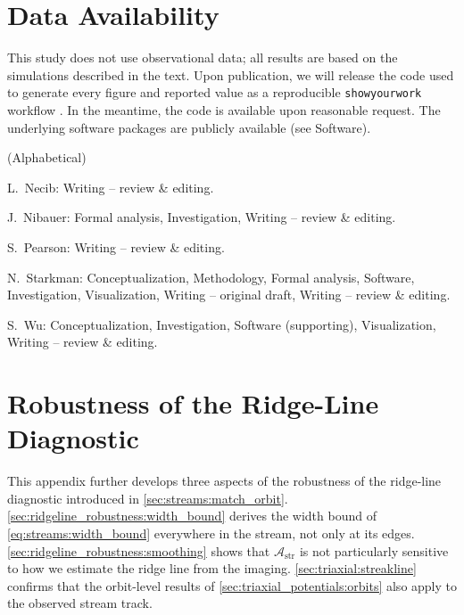 \documentclass[linenumbers,twocolumn]{aastex701}
\newcommand{\Astr}{\mathcal{A}_{\mathrm{str}}}
\begin{document}
\section*{Data Availability}\label{sec:data_availability}
    This study does not use observational data; all results are based on the simulations described in the text. %
    Upon publication, we will release the code used to generate every figure and reported value as a reproducible \texttt{showyourwork} workflow \citep{Luger+:2021:showyourwork}. %
    In the meantime, the code is available upon reasonable request. %
    The underlying software packages are publicly available (see Software). %

\begin{contribution}\label{sec:author_contributions}
    (Alphabetical)

    L.~Necib: Writing -- review \& editing.

    J.~Nibauer: Formal analysis, Investigation, Writing -- review \& editing.

    S.~Pearson: Writing -- review \& editing.

    N.~Starkman: Conceptualization, Methodology, Formal analysis, Software, Investigation, Visualization, Writing -- original draft, Writing -- review \& editing.

    S.~Wu: Conceptualization, Investigation, Software (supporting), Visualization, Writing -- review \& editing.
\end{contribution}



\appendix


\section{Robustness of the Ridge-Line Diagnostic}\label{sec:ridgeline_robustness}

    This appendix further develops three aspects of the robustness of the ridge-line diagnostic introduced in \autoref{sec:streams:match_orbit}. %
    \autoref{sec:ridgeline_robustness:width_bound} derives the width bound of \cref{eq:streams:width_bound} everywhere in the stream, not only at its edges. %
    \autoref{sec:ridgeline_robustness:smoothing} shows that $\Astr$ is not particularly sensitive to how we estimate the ridge line from the imaging. %
    \autoref{sec:triaxial:streakline} confirms that the orbit-level results of \autoref{sec:triaxial_potentials:orbits} also apply to the observed stream track. %
    
\end{document}
